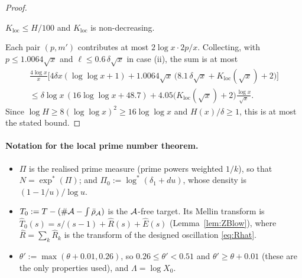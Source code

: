 \begin{proof}
\begin{enumerate}[label=(\roman*)]
\begin{itemize}
    $K_{\mathrm{loc}}\le H/100$ and $K_{\mathrm{loc}}$ is non-decreasing.
  \end{itemize}
\end{enumerate}
Each pair $(p,m')$ contributes at most $2\log x\cdot2p/x$. Collecting, with $p\le1.0064\sqrt x$ and $\ell\le0.6\,\delta\sqrt x$ in
case (ii), the sum is at most
\begin{multline*}
  \frac{4\log x}x\Big[4\delta x(\log\log x+1)+1.0064\sqrt x\,\big(8.1\,\delta\sqrt x+K_{\mathrm{loc}}(\sqrt x)+2\big)\Big]\\
  \le\delta\log x\,(16\log\log x+48.7)+4.05\big(K_{\mathrm{loc}}(\sqrt x)+2\big)\frac{\log x}{\sqrt x}.
\end{multline*}
Since $\log H\ge8(\log\log x)^2\ge16\log\log x$ and $H(x)/\delta\ge1$, this is at most the stated bound.
\end{proof}

\paragraph{Notation for the local prime number theorem.}
\begin{itemize}
\item $\Pi$ is the realised prime measure (prime powers weighted $1/k$), so that $N=\exp^*(\Pi)$; and
  $\Pi_0:=\log^*(\delta_1+du)$, whose density is $(1-1/u)/\log u$.
\item $T_0:=T-(\#\mathcal{A}-\int\bar\rho_{\mathcal{A}})$ is the $\mathcal{A}$-free target. Its Mellin transform is
  $\hat T_0(s)=s/(s-1)+\hat R(s)+\hat E(s)$ (Lemma~\ref{lem:ZBlow}), where $\hat R=\sum_k\hat R_k$ is the transform of the
  designed oscillation \eqref{eq:Rhat}.
\item $\theta':=\max(\theta+0.01,0.26)$, so $0.26\le\theta'<0.51$ and $\theta'\ge\theta+0.01$ (these are the only properties
  used), and $\Lambda=\log X_0$.
\end{itemize}

